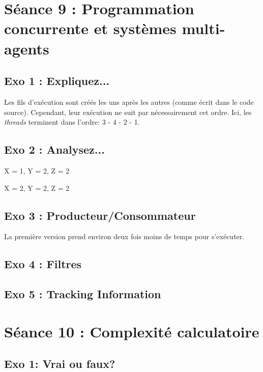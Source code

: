 \newpage
\section{Séance 9 : Programmation concurrente et systèmes multi-agents}
\subsection{Exo 1 : Expliquez...}


Les fils d'exécution sont créés les uns après les autres (comme écrit dans le code source). Cependant, leur exécution ne suit par nécessairement cet ordre.
Ici, les \textit{threads} terminent dans l'ordre: 3 - 4 - 2 - 1. 


\subsection{Exo 2 : Analysez...}

X = 1, Y = 2, Z = 2

X = 2, Y = 2, Z = 2

\subsection{Exo 3 : Producteur/Consommateur}

La première version prend environ deux fois moins de temps pour s'exécuter.


\subsection{Exo 4 : Filtres}



\subsection{Exo 5 : Tracking Information}




\newpage
\section{Séance 10 : Complexité calculatoire}
\subsection{Exo 1: Vrai ou faux?}







